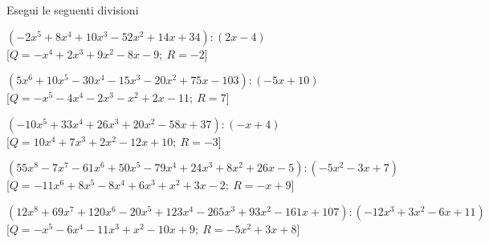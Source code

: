 \begin{esercizio}\label{ese:div.002}
 Esegui le seguenti divisioni
 \begin{enumeratea}
  \item  $\left(-2 x^5 +8 x^4 +10 x^3 -52 x^2 +14 x +34 \right) : 
          \left(2 x -4 \right)$ \\
   \hfill [$Q = - x^4 +2 x^3 +9 x^2 -8 x -9;~R = -2$]
  \item  $\left(5 x^6 +10 x^5 -30 x^4 -15 x^3 -20 x^2 +75 x -103 \right) : 
          \left(-5 x +10 \right)$ \\
   \hfill [$Q = - x^5 -4 x^4 -2 x^3 - x^2 +2 x -11;~R = 7$]
  \item  $\left(-10 x^5 +33 x^4 +26 x^3 +20 x^2 -58 x +37 \right) : 
          \left(- x +4 \right)$ \\
   \hfill [$Q = 10 x^4 +7 x^3 +2 x^2 -12 x +10;~R = -3$]
  \item  $\left(55 x^8 -7 x^7 -61 x^6 +50 x^5 -79 x^4 +24 x^3 +8 x^2 +
                26 x -5 \right) : \left(-5 x^2 -3 x +7 \right)$ \\
   \hfill [$Q = -11 x^6 +8 x^5 -8 x^4 +6 x^3 + x^2 +3 x -2;~R = - x +9$]
  \item  $\left(12 x^8 +69 x^7 +120 x^6 -20 x^5 +123 x^4 -265 x^3 +93 x^2 -
                161 x +107 \right) : \left(-12 x^3 +3 x^2 -6 x +11 \right)$ \\
   \hfill [$Q = - x^5 -6 x^4 -11 x^3 + x^2 -10 x +9;~R = -5 x^2 +3 x +8$]

\end{enumeratea}
\end{esercizio}
